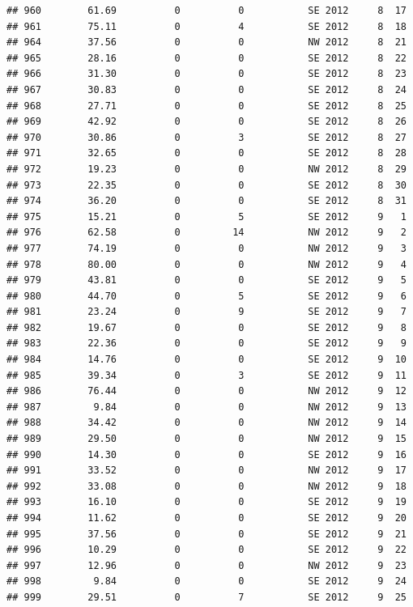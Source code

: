 \documentclass[
]{article}
\begin{document}
\begin{verbatim}
## 960        61.69          0          0           SE 2012     8  17
## 961        75.11          0          4           SE 2012     8  18
## 964        37.56          0          0           NW 2012     8  21
## 965        28.16          0          0           SE 2012     8  22
## 966        31.30          0          0           SE 2012     8  23
## 967        30.83          0          0           SE 2012     8  24
## 968        27.71          0          0           SE 2012     8  25
## 969        42.92          0          0           SE 2012     8  26
## 970        30.86          0          3           SE 2012     8  27
## 971        32.65          0          0           SE 2012     8  28
## 972        19.23          0          0           NW 2012     8  29
## 973        22.35          0          0           SE 2012     8  30
## 974        36.20          0          0           SE 2012     8  31
## 975        15.21          0          5           SE 2012     9   1
## 976        62.58          0         14           NW 2012     9   2
## 977        74.19          0          0           NW 2012     9   3
## 978        80.00          0          0           NW 2012     9   4
## 979        43.81          0          0           SE 2012     9   5
## 980        44.70          0          5           SE 2012     9   6
## 981        23.24          0          9           SE 2012     9   7
## 982        19.67          0          0           SE 2012     9   8
## 983        22.36          0          0           SE 2012     9   9
## 984        14.76          0          0           SE 2012     9  10
## 985        39.34          0          3           SE 2012     9  11
## 986        76.44          0          0           NW 2012     9  12
## 987         9.84          0          0           NW 2012     9  13
## 988        34.42          0          0           NW 2012     9  14
## 989        29.50          0          0           NW 2012     9  15
## 990        14.30          0          0           SE 2012     9  16
## 991        33.52          0          0           NW 2012     9  17
## 992        33.08          0          0           NW 2012     9  18
## 993        16.10          0          0           SE 2012     9  19
## 994        11.62          0          0           SE 2012     9  20
## 995        37.56          0          0           SE 2012     9  21
## 996        10.29          0          0           SE 2012     9  22
## 997        12.96          0          0           NW 2012     9  23
## 998         9.84          0          0           SE 2012     9  24
## 999        29.51          0          7           SE 2012     9  25

\end{verbatim}
\end{document}
